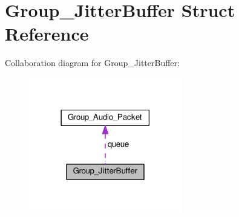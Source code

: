 \hypertarget{struct_group___jitter_buffer}{\section{Group\+\_\+\+Jitter\+Buffer Struct Reference}
\label{struct_group___jitter_buffer}
}


Collaboration diagram for Group\+\_\+\+Jitter\+Buffer\+:
\nopagebreak
\begin{figure}[H]
\begin{center}
\leavevmode
\includegraphics[width=189pt]{struct_group___jitter_buffer__coll__graph}
\end{center}
\end{figure}
